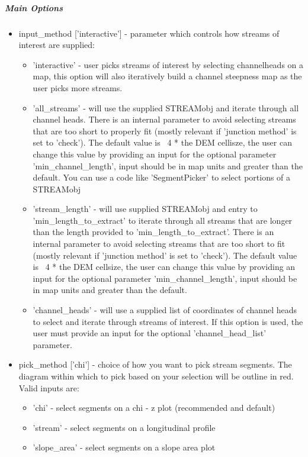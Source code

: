 \subparagraph{Main Options}
\begin{itemize}
	\item input\_method ['interactive'] - parameter which controls how streams of interest are supplied:
	\begin{itemize}
		\item 'interactive' - user picks streams of interest by selecting channelheads on a map, this option will also iteratively build a 
		channel steepness map as the user picks more streams.
		\item 'all\_streams' - will use the supplied STREAMobj and iterate through all channel heads. There is an internal parameter to avoid 
		selecting streams that are too short to properly fit (mostly relevant if 'junction method' is set to 'check'). The default 
		value is ~4 * the DEM cellisze, the user can change this value by providing an input for the optional parameter 'min\_channel\_length',
		input should be in map units and greater than the default. You can use a code like 'SegmentPicker' to select portions of a STREAMobj
		\item 'stream\_length' - will use supplied STREAMobj and entry to 'min\_length\_to\_extract' to iterate through all streams that are longer than
		the length provided to 'min\_length\_to\_extract'. There is an internal parameter to avoid selecting streams that are too short to fit
		(mostly relevant if 'junction method' is set to 'check'). The default value is ~4 * the DEM cellsize, the user can change this value
		by providing an input for the optional parameter 'min\_channel\_length', input should be in map units and greater than the default.
		\item 'channel\_heads' - will use a supplied list of coordinates of channel heads to select and iterate through streams of interest. If this
		option is used, the user must provide an input for the optional 'channel\_head\_list' parameter.
	\end{itemize}
	
	\item pick\_method ['chi'] - choice of how you want to pick stream segments. The diagram within which to pick based on your selection will be 
	outline in red. Valid inputs are:
	\begin{itemize}
		\item 'chi' - select segments on a chi - z plot (recommended and default)
		\item 'stream' - select segments on a longitudinal profile
		\item 'slope\_area' - select segments on a slope area plot
	\end{itemize}
	

\end{itemize}
